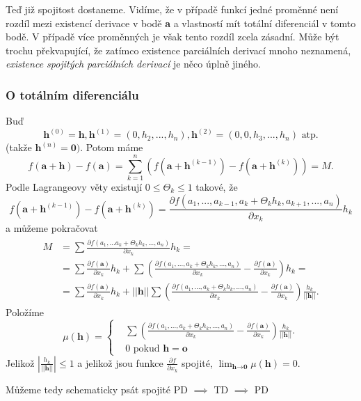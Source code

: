 \documentclass[../main.tex]{subfiles}
\begin{document}
Teď již spojitost dostaneme. Vidíme, že v případě funkcí jedné proměnné není rozdíl mezi existencí derivace v bodě \textbf{a} a vlastností
mít totální diferenciál v tomto bodě. V případě více proměnných je však tento rozdíl zcela zásadní. Může být trochu překvapující, že 
zatímco existence parciálních derivací mnoho neznamená, \textit{existence spojitých parciálních derivací} je něco úplně jiného.

\subsubsection{O totálním diferenciálu}
Buď
\[\textbf{h}^{(0)} = \textbf{h}, \textbf{h}^{(1)} = (0, h_2,...,h_n), \textbf{h}^{(2)} = (0,0,h_3,...,h_n) \textrm{ atp.} \]
(takže $\textbf{h}^{(n)} = \textbf{0})$.
Potom máme
\[f(\textbf{a}+\textbf{h}) - f(\textbf{a}) = \sum^n_{k=1}(f(\textbf{a}+\textbf{h}^{(k-1)})-f(\textbf{a}+\textbf{h}^{(k)})) = M.\]
Podle Lagrangeovy věty existují $0 \leq \Theta_k \leq 1$ takové, že
\[f(\textbf{a}+\textbf{h}^{(k-1)})-f(\textbf{a}+\textbf{h}^{(k)}) = \frac{\partial f(a_1,...,a_{k-1},a_k+ \Theta_kh_k,a_{k+1},...,a_n)}{\partial x_k}h_k\]
a můžeme pokračovat
\begin{align*} 
	\begin{split}
		M & = \sum\frac{\partial f(a_1,...a_k+\Theta_kh_k,...,a_n)}{\partial x_k}h_k = \\
		 & = \sum \frac{\partial f(\textbf{a})}{\partial x_k}h_k + \sum \left( \frac{\partial f(a_1,...,a_k+\Theta_kh_k,...,a_n)}{\partial x_k}
		 - \frac{\partial f(\textbf{a})}{\partial x_k} \right)h_k = \\
		 & = \sum \frac{\partial f(\textbf{a})}{\partial x_k}h_k + ||\textbf{h}||\sum\left(\frac{\partial f(a_1,...,a_k+\Theta_kh_k,...,a_n)}
		 {\partial x_k}- \frac{\partial f(\textbf{a})}{\partial x_k}\right)\frac{h_k}{||\textbf{h}||}.
	\end{split}
\end{align*}
Položíme
\[\mu (\textbf{h}) =
    \begin{cases} & \sum\left(\frac{\partial f(a_1,...,a_k+\Theta_kh_k,...,a_n)}{\partial x_k} -
    \frac{\partial f(\textbf{a})}{\partial x_k} \right)\frac{h_k}{||\textbf{h}||}.\\
    & 0 \text{ pokud } \mathbf{h} = \mathbf{o}
    \end{cases}\]
Jelikož $\left|\frac{h_k}{||\textbf{h}||}\right| \leq 1$ a jelikož jsou funkce $\frac{\partial f}{\partial x_k}$ spojité,
$\lim_{\textbf{h}\rightarrow \textbf{0}} \mu (\textbf{h}) = 0$.
\begin{center}
\LARGE 
Můžeme tedy schematicky psát spojité PD $\implies$ TD $\implies$ PD
\end{center}
\end{document}
